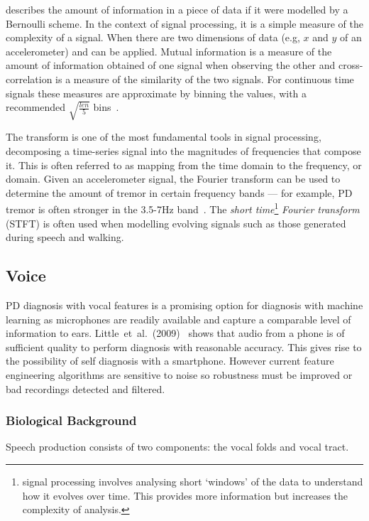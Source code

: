 \documentclass[12pt, twoside]{book}
\renewcommand\emph[1]{\textit{\color{USred}{#1}}}
\begin{document}
\emph{Entropy} describes the amount of information in a piece of data if it were modelled by a Bernoulli scheme. In the context of signal processing, it is a simple measure of the complexity of a signal. When there are two dimensions of data (e.g, $x$ and $y$ of an accelerometer) \emph{mutual information} and \emph{cross correlation} can be applied. Mutual information is a measure of the amount of information obtained of one signal when observing the other and cross-correlation is a measure of the similarity of the two signals. For continuous time signals these measures are approximate by binning the values, with a recommended $\sqrt{\frac{len}{5}}$ bins~\cite{entropymeasures}.

The \emph{Fourier} transform is one of the most fundamental tools in signal processing, decomposing a time-series signal into the magnitudes of frequencies that compose it. This is often referred to as mapping from the time domain to the frequency, or \emph{spectral} domain. Given an accelerometer signal, the Fourier transform can be used to determine the amount of tremor in certain frequency bands --- for example, PD tremor is often stronger in the 3.5-7Hz band~\cite{duval2004detection}. The \textit{short time}\footnote{\emph{Short time} signal processing involves analysing short `windows' of the data to understand how it evolves over time. This provides more information but increases the complexity of analysis.} \textit{Fourier transform} (STFT) is often used when modelling evolving signals such as those generated during speech and walking. 




\subsection{Voice}
PD diagnosis with vocal features is a promising option for diagnosis with machine learning as microphones are readily available and capture a comparable level of information to ears. Little~et~al.~(2009)~\cite{splittledysphonia2009} shows that audio from a phone is of sufficient quality to perform diagnosis with reasonable accuracy. This gives rise to the possibility of self diagnosis with a smartphone. However current feature engineering algorithms are sensitive to noise so robustness must be improved or bad recordings detected and filtered.


\subsubsection{Biological Background}
\label{speechbio}
Speech production consists of two components: the vocal folds and vocal tract. 
\end{document}
